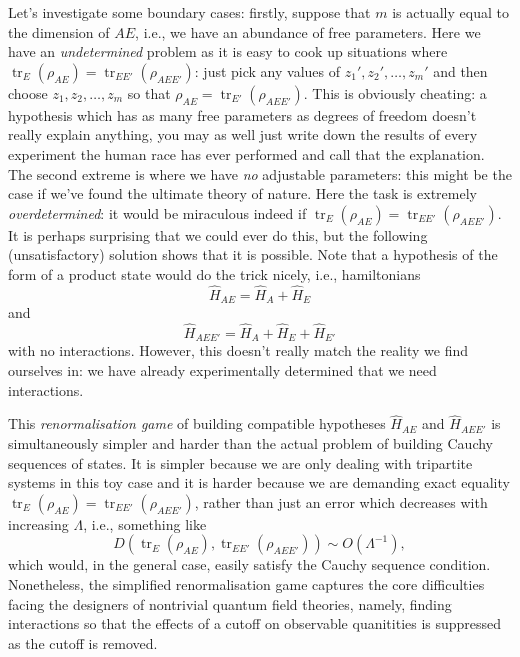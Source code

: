 \documentclass[11pt]{amsart}
\DeclareMathOperator{\tr}{tr}
\theoremstyle{plain}%
\theoremstyle{definition}
\theoremstyle{remark}
\begin{document}
Let's investigate some boundary cases: firstly, suppose that $m$ is actually equal to the dimension of $AE$, i.e., we have an abundance of free parameters. Here we have an \emph{undetermined} problem as it is easy to cook up situations where $\tr_{E}(\rho_{AE}) = \tr_{EE'}(\rho_{AEE'})$: just pick any values of $z_1', z_2', \ldots, z_m'$ and then choose $z_1, z_2, \ldots, z_m$ so that $\rho_{AE} = \tr_{E'}(\rho_{AEE'})$. This is obviously cheating: a hypothesis which has as many free parameters as degrees of freedom doesn't really explain anything, you may as well just write down the results of every experiment the human race has ever performed and call that the explanation. The second extreme is where we have \emph{no} adjustable parameters: this might be the case if we've found the ultimate theory of nature. Here the task is extremely \emph{overdetermined}: it would be miraculous indeed if $\tr_{E}(\rho_{AE}) = \tr_{EE'}(\rho_{AEE'})$. It is perhaps surprising that we could ever do this, but the following (unsatisfactory) solution shows that it is possible. Note that a hypothesis of the form of a product state would do the trick nicely, i.e., hamiltonians 
\begin{equation}
	\widehat{H}_{AE} = \widehat{H}_A + \widehat{H}_E
\end{equation}
and 
\begin{equation}
	\widehat{H}_{AEE'} = \widehat{H}_A + \widehat{H}_E + \widehat{H}_{E'}
\end{equation}
with no interactions. However, this doesn't really match the reality we find ourselves in: we have already experimentally determined that we need interactions.

This \emph{renormalisation game} of building compatible hypotheses $\widehat{H}_{AE}$ and $\widehat{H}_{AEE'}$ is simultaneously simpler and harder than the actual problem of building Cauchy sequences of states. It is simpler because we are only dealing with tripartite systems in this toy case and it is harder because we are demanding exact equality $\tr_{E}(\rho_{AE}) = \tr_{EE'}(\rho_{AEE'})$, rather than just an error which decreases with increasing $\Lambda$, i.e., something like
\begin{equation}
	D(\tr_{E}(\rho_{AE}), \tr_{EE'}(\rho_{AEE'})) \sim O(\Lambda^{-1}),
\end{equation}
which would, in the general case, easily satisfy the Cauchy sequence condition. Nonetheless, the simplified renormalisation game captures the core difficulties facing the designers of nontrivial quantum field theories, namely, finding interactions so that the effects of a cutoff on observable quanitities is suppressed as the cutoff is removed. 
\end{document}
